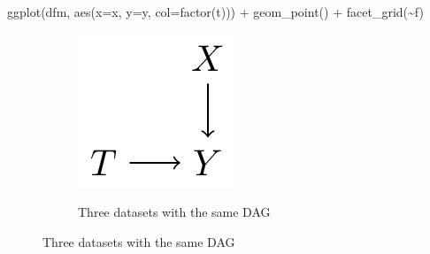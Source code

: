 \documentclass[
  letterpaper,
  DIV=11,
  numbers=noendperiod]{scrartcl}
\newenvironment{Shaded}{\begin{snugshade}}{\end{snugshade}}
\newcommand{\AttributeTok}[1]{\textcolor[rgb]{0.40,0.45,0.13}{#1}}
\newcommand{\FunctionTok}[1]{\textcolor[rgb]{0.28,0.35,0.67}{#1}}
\newcommand{\NormalTok}[1]{\textcolor[rgb]{0.00,0.23,0.31}{#1}}
\newcommand{\SpecialCharTok}[1]{\textcolor[rgb]{0.37,0.37,0.37}{#1}}
\begin{document}
\begin{Shaded}
\begin{Highlighting}[]
\FunctionTok{ggplot}\NormalTok{(dfm, }\FunctionTok{aes}\NormalTok{(}\AttributeTok{x=}\NormalTok{x, }\AttributeTok{y=}\NormalTok{y, }\AttributeTok{col=}\FunctionTok{factor}\NormalTok{(t))) }\SpecialCharTok{+} 
  \FunctionTok{geom\_point}\NormalTok{() }\SpecialCharTok{+} 
  \FunctionTok{facet\_grid}\NormalTok{(}\SpecialCharTok{\textasciitilde{}}\NormalTok{f)}
\end{Highlighting}
\end{Shaded}

\begin{figure}

\begin{minipage}{0.30\linewidth}

\begin{figure}[H]

{\centering \includegraphics{_tikzs/dag-nonparametric.png}

}


\end{figure}%

\end{minipage}%
%
\begin{minipage}{0.70\linewidth}

\begin{figure}[H]


\caption{\label{fig-dag-nonparametric}Three datasets with the same DAG}

\end{figure}%

\end{minipage}%

\end{figure}%
\end{document}
